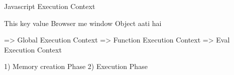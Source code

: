Javascript Execution Context

  This key value Browser me window Object aati hai

   => Global Execution Context
   => Function Execution Context
   => Eval Execution Context

    1) Memory creation Phase
    2) Execution Phase